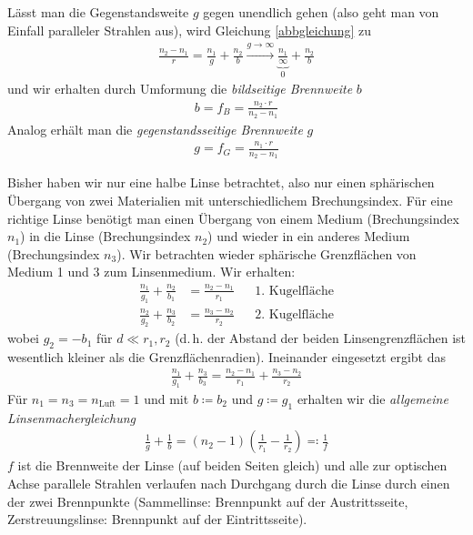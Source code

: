 Lässt man die Gegenstandsweite $g$
gegen unendlich gehen (also geht man von Einfall paralleler Strahlen
aus), wird Gleichung \eqref{abbgleichung} zu
\begin{gather*}
  \frac{n_2-n_1}{r}
  = \frac{n_1}{g} + \frac{n_2}{b}
  \overset{g\to\infty}{\longrightarrow}
  \underbrace{\frac{n_1}{\infty}}_{0} + \frac{n_2}{b} 
\end{gather*}
und wir erhalten durch Umformung die 
\emph{bildseitige Brennweite}
$b$
\begin{gather*}
  b = f_B = \frac{n_2\cdot r}{n_2-n_1}
\end{gather*}
Analog erhält man die
\emph{gegenstandsseitige Brennweite}%
$g$
\begin{gather*}
  g = f_G = \frac{n_1\cdot r}{n_2-n_1}
\end{gather*}

Bisher haben wir nur eine halbe Linse betrachtet, also nur einen
sphärischen Übergang von zwei Materialien mit unterschiedlichem
Brechungsindex.
Für eine richtige Linse benötigt man einen Übergang von einem Medium
(Brechungsindex $n_1$) in die Linse (Brechungsindex $n_2$) und wieder
in ein anderes Medium (Brechungsindex $n_3$). 
Wir betrachten wieder sphärische Grenzflächen von Medium 1 und 3 zum
Linsenmedium. Wir erhalten:
\begin{align*}
  \frac{n_1}{g_1} + \frac{n_2}{b_1} &= \frac{n_2-n_1}{r_1}
  &&\text{1. Kugelfläche}\\
  \frac{n_2}{g_2} + \frac{n_3}{b_2} &= \frac{n_3-n_2}{r_2}
  &&\text{2. Kugelfläche}
\end{align*}
wobei $g_2 = -b_1$ für $d\ll r_1,r_2$ (d.\,h. der Abstand der beiden
Linsengrenzflächen ist wesentlich kleiner als die Grenzflächenradien).
Ineinander eingesetzt ergibt das
\begin{gather*}
  \frac{n_1}{g_1} + \frac{n_3}{b_3} 
  = \frac{n_2-n_1}{r_1} + \frac{n_3-n_2}{r_2}
\end{gather*}
Für $n_1=n_3=n_\text{Luft}=1$ und
mit $b\coloneqq b_2$ und $g\coloneqq g_1$ erhalten wir die
\emph{allgemeine Linsenmachergleichung}%
\begin{gather*}
  \frac{1}{g} + \frac{1}{b}
  = (n_2-1)\left( \frac{1}{r_1}-\frac{1}{r_2} \right)
  \eqqcolon \frac{1}{f}
\end{gather*}
$f$ ist die Brennweite der Linse (auf beiden Seiten gleich) und alle
zur optischen Achse parallele Strahlen verlaufen nach Durchgang durch
die Linse durch einen der zwei Brennpunkte
(Sammellinse: Brennpunkt auf der Austrittsseite, Zerstreuungslinse:
Brennpunkt auf der Eintrittsseite).


